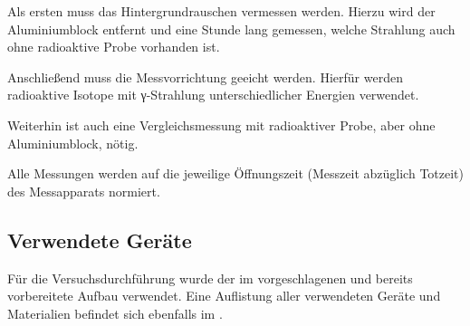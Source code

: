 Als ersten muss das Hintergrundrauschen vermessen werden. Hierzu wird der
Aluminiumblock entfernt und eine Stunde lang gemessen, welche Strahlung auch
ohne radioaktive Probe vorhanden ist.

Anschließend muss die Messvorrichtung geeicht werden. Hierfür werden radioaktive
Isotope mit γ-Strahlung unterschiedlicher Energien verwendet.

Weiterhin ist auch eine Vergleichsmessung mit radioaktiver Probe, aber ohne
Aluminiumblock, nötig.

Alle Messungen werden auf die jeweilige Öffnungszeit (Messzeit abzüglich Totzeit)
des Messapparats normiert.

\subsection{Verwendete Geräte}

Für die Versuchsdurchführung wurde der im \cite{script} vorgeschlagenen und
bereits vorbereitete Aufbau verwendet. Eine Auflistung aller verwendeten
Geräte und Materialien befindet sich ebenfalls im \cite[Kap. 6]{script}.